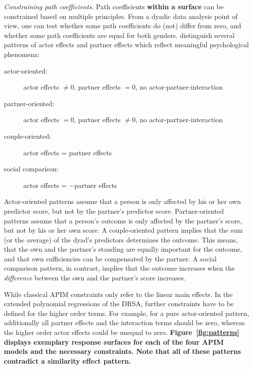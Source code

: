 \documentclass[jou,a4paper,draftfirst]{apa6}
\newcommand{\added}[1]{\textcolor{colour_added}{\bf{#1}}}
\begin{document}
\emph{Constraining path coefficients.}
Path coefficients \added{within a surface} can be constrained based on multiple principles. From a dyadic data analysis point of view, one can test whether some path coefficients do (not) differ from zero, and whether some path coefficients are equal for both genders. \textcite{kenny_partner_1999} distinguish several patterns of actor effects and partner effects which reflect meaningful psychological phenomena:

\begin{description}
	\item[actor-oriented:] actor effects $\neq 0$, partner effects $= 0$, no actor-partner-interaction
	\item[partner-oriented:] actor effects $= 0$, partner effects $\neq 0$, no actor-partner-interaction
	\item[couple-oriented:] actor effects = partner effects
	\item[social comparison:] actor effects = $-$partner effects
\end{description}

Actor-oriented patterns assume that a person is only affected by his or her own predictor score, but not by the partner's predictor score. Partner-oriented patterns assume that a person's outcome is only affected by the partner's score, but not by his or her own score. A couple-oriented pattern implies that the sum (or the average) of the dyad's predictors determines the outcome. This means, that the own and the partner's standing are equally important for the outcome, and that own sufficiencies can be compensated by the partner. A social comparison pattern, in contrast, implies that the outcome increases when the \emph{difference} between the own and the partner's score increases. 

While classical APIM constraints only refer to the linear main effects. In the extended polynomial regressions of the DRSA, further constraints have to be defined for the higher order terms. For example, for a pure actor-oriented pattern, additionally all partner effects and the interaction terms should be zero, whereas the higher order actor effects could be unequal to zero.
\added{Figure~\ref{fig:patterns} displays exemplary response surfaces for each of the four APIM models and the necessary constraints. Note that all of these patterns contradict a similarity effect pattern.}


\begin{figure*}[ht!]
\centering
{}
\caption{Examples for APIM patterns displayed as response surfaces. Figure available at \url{https://osf.io/ftsrd/}, under a CC-BY4.0 license.}
\label{fig:patterns}
\end{figure*}
\end{document}
